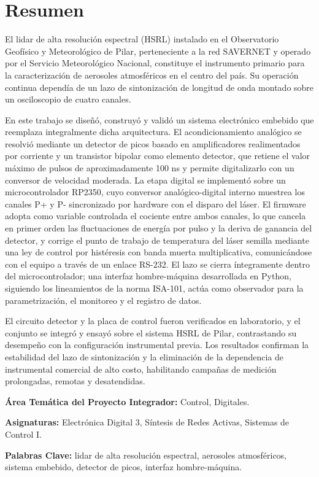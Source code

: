 \chapter*{Resumen}
{}
El lidar de alta resolución espectral (HSRL) instalado en el Observatorio Geofísico y Meteorológico de Pilar, perteneciente a la red SAVERNET y operado por el Servicio Meteorológico Nacional, constituye el instrumento primario para la caracterización de aerosoles atmosféricos en el centro del país. Su operación continua dependía de un lazo de sintonización de longitud de onda montado sobre un osciloscopio de cuatro canales.

En este trabajo se diseñó, construyó y validó un sistema electrónico embebido que reemplaza integralmente dicha arquitectura. El acondicionamiento analógico se resolvió mediante un detector de picos basado en amplificadores realimentados por corriente y un transistor bipolar como elemento detector, que retiene el valor máximo de pulsos de aproximadamente 100 ns y permite digitalizarlo con un conversor de velocidad moderada. La etapa digital se implementó sobre un microcontrolador RP2350, cuyo conversor analógico-digital interno muestrea los canales P+ y P- sincronizado por hardware con el disparo del láser. El firmware adopta como variable controlada el cociente entre ambos canales, lo que cancela en primer orden las fluctuaciones de energía por pulso y la deriva de ganancia del detector, y corrige el punto de trabajo de temperatura del láser semilla mediante una ley de control por histéresis con banda muerta multiplicativa, comunicándose con el equipo a través de un enlace RS-232. El lazo se cierra íntegramente dentro del microcontrolador; una interfaz hombre-máquina desarrollada en Python, siguiendo los lineamientos de la norma ISA-101, actúa como observador para la parametrización, el monitoreo y el registro de datos.

El circuito detector y la placa de control fueron verificados en laboratorio, y el conjunto se integró y ensayó sobre el sistema HSRL de Pilar, contrastando su desempeño con la configuración instrumental previa. Los resultados confirman la estabilidad del lazo de sintonización y la eliminación de la dependencia de instrumental comercial de alto costo, habilitando campañas de medición prolongadas, remotas y desatendidas.

\vspace{1cm}
\noindent\textbf{\'Area Tem\'atica del Proyecto Integrador:} Control, Digitales.

\noindent\textbf{Asignaturas:} Electr\'onica Digital 3, S\'intesis de Redes
Activas, Sistemas de Control I.

\noindent\textbf{Palabras Clave:} lidar de alta resolución espectral, aerosoles atmosféricos, sistema embebido, detector de picos, interfaz hombre-máquina.

\cleardoublepage

